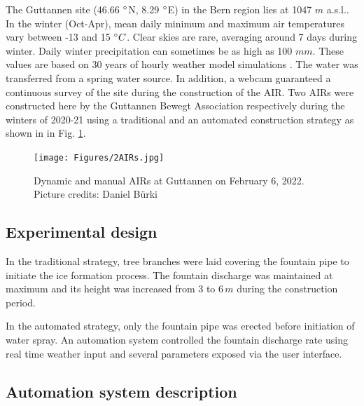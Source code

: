 \documentclass[utf8]{frontiersSCNS}
\begin{document}
The Guttannen site (46.66 $\degree$N, 8.29 $\degree$E) in the Bern region lies at 1047 $m$ a.s.l.. In the winter
(Oct-Apr), mean daily minimum and maximum air temperatures vary between -13 and 15 $\degree C$. Clear skies are
rare, averaging around 7 days during winter. Daily winter precipitation can sometimes be as high as 100 $mm$.
These values are based on 30 years of hourly weather model simulations \citep{guttannen}. The water was
transferred from a spring water source. In addition, a webcam guaranteed a continuous survey of the site during
the construction of the AIR. Two AIRs were constructed here by the Guttannen Bewegt Association respectively
during the winters of 2020-21 using a traditional and an automated construction strategy as shown in in Fig.
\ref{fig:2AIR}.

\begin{figure}
	\begin{center}
		\texttt{[image: Figures/2AIRs.jpg]}
	\end{center}
  \caption{Dynamic and manual AIRs at Guttannen on February 6, 2022. Picture credits: Daniel Bürki}
\label{fig:2AIR} \end{figure}


\subsection{Experimental design}


In the traditional strategy, tree branches were laid covering the fountain pipe to initiate the ice formation
process. The fountain discharge was maintained at maximum and its height was increased from 3 to 6\,$m$ during
the construction period.


In the automated strategy, only the fountain pipe was erected before initiation of water spray. An automation
system controlled the fountain discharge rate using real time weather input and several parameters exposed via
the user interface. 

\subsection{Automation system description}
\end{document}
